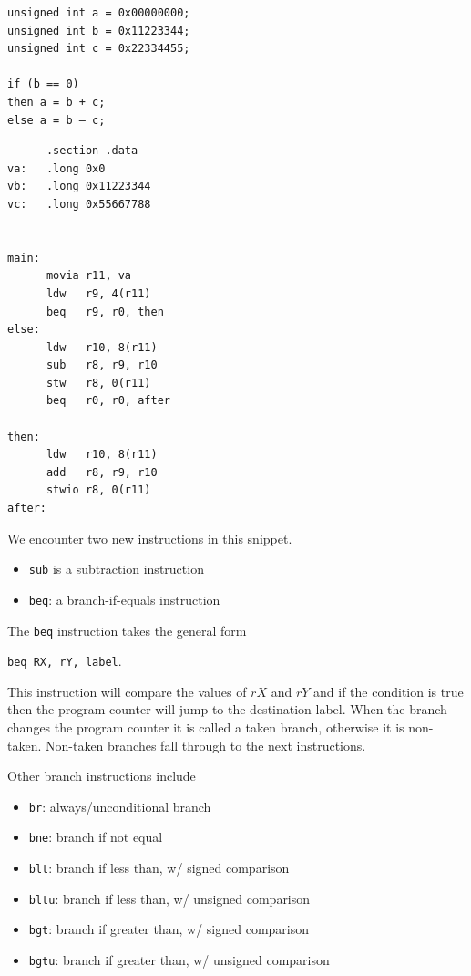 \documentclass[10pt]{article}
\begin{document}
\begin{listing}[H]
\begin{verbatim}
unsigned int a = 0x00000000;
unsigned int b = 0x11223344;
unsigned int c = 0x22334455;

if (b == 0)
then a = b + c;
else a = b – c;

\end{verbatim}
\end{listing}

\begin{listing}[H]
\begin{verbatim}
      .section .data
va:   .long 0x0
vb:   .long 0x11223344
vc:   .long 0x55667788
 

main:
      movia r11, va
      ldw   r9, 4(r11)
      beq   r9, r0, then
else:
      ldw   r10, 8(r11)
      sub   r8, r9, r10
      stw   r8, 0(r11)
      beq   r0, r0, after

then:
      ldw   r10, 8(r11)
      add   r8, r9, r10
      stwio r8, 0(r11)
after:
\end{verbatim}
\end{listing}
\begin{definition}

	We encounter two new instructions in this snippet.
\begin{itemize}
	\item \texttt{sub} is a subtraction instruction
	\item \texttt{beq}: a branch-if-equals instruction
\end{itemize}

The \texttt{beq} instruction takes the general form 

\texttt{beq RX, rY, label}. 

This instruction will compare the values of $ rX $ and $ rY $ and if the condition is true then the program counter will jump to the destination label. 
When the branch changes the program counter it is called a taken branch, otherwise it is non-taken. Non-taken branches fall through to the next instructions. 

Other branch instructions include


\begin{itemize}
	\item \texttt{br}: always/unconditional branch
	\item \texttt{bne}: branch if not equal
	\item \texttt{blt}: branch if less than, w/ signed comparison
	\item \texttt{bltu}: branch if less than, w/ unsigned comparison
	\item \texttt{bgt}: branch if greater than, w/ signed comparison
	\item \texttt{bgtu}: branch if greater than, w/ unsigned comparison


\end{itemize}


\end{definition}
\end{document}
